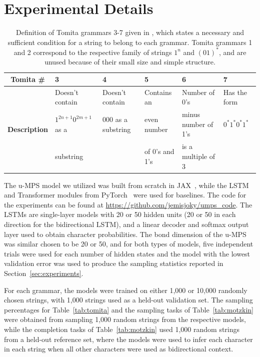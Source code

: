 \documentclass[twoside]{article}
\begin{document}
\section{Experimental Details}
\label{sec:appendix_d}

\begin{table}[h]
\caption{Definition of Tomita grammars 3-7 given in \citep{bengio1994}, which states a necessary and sufficient condition for a string to belong to each grammar. Tomita grammars 1 and 2 correspond to the respective family of strings $1^n$ and $(01)^*$, and are unused because of their small size and simple structure.}
\label{tab:tomita_def}
\begin{center}
\begin{small}
\begin{tabular}{c|lllll}
    \textbf{Tomita \#} & 3 & 4 & 5 & 6 & 7 \\
    \midrule
    \multirow{3}{*}{\textbf{Description}} & Doesn't contain         & Doesn't contain      & Contains an    & Number of 0's       & Has the form \\
                                          & $1^{2n+1}0^{2m+1}$ as a & $000$ as a substring & even number    & minus number of 1's & $0^*1^*0^*1^*$ \\
                                          & substring               &                      & of 0's and 1's & is a multiple of 3  & 
\end{tabular}
\end{small}
\end{center}
\end{table}

The u-MPS model we utilized was built from scratch in JAX~\citep{jax2018}, while the LSTM and Transformer modules from PyTorch~\citep{paszke2017} were used for baselines. The code for the experiments can be found at \url{https://github.com/jemisjoky/umps_code}. 
The LSTMs are single-layer models with 20 or 50 hidden units (20 or 50 in each direction for the bidirectional LSTM), and a linear decoder and softmax output layer used to obtain character probabilities. The bond dimension of the u-MPS was similar chosen to be 20 or 50, and for both types of models, five independent trials were used for each number of hidden states and the model with the lowest validation error was used to produce the sampling statistics reported in Section~\ref{sec:experiments}. 

For each grammar, the models were trained on either 1,000 or 10,000 randomly chosen strings, with 1,000 strings used as a held-out validation set. The sampling percentages for Table~\ref{tab:tomita} 
and the sampling tasks of Table~\ref{tab:motzkin} 
were obtained from sampling 1,000 random strings from the respective models, while the completion tasks of Table~\ref{tab:motzkin} 
used 1,000 random strings from a held-out reference set, where the models were used to infer each character in each string when all other characters were used as bidirectional context.
\end{document}

